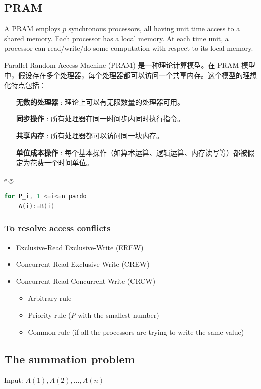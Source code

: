\documentclass{article}
\begin{document}
\subsection{PRAM}
A PRAM employs $p$ synchronous processors, all having unit time access to a shared memory. Each processor has a local memory. At each time unit, a processor can read/write/do some computation with respect to its local memory. 

Parallel Random Access Machine (PRAM) 是一种理论计算模型。在 PRAM 模型中，假设存在多个处理器，每个处理器都可以访问一个共享内存。这个模型的理想化特点包括：

\begin{enumerate}
    \item [\textbf{无数的处理器}]: 理论上可以有无限数量的处理器可用。
    \item [\textbf{同步操作}]: 所有处理器在同一时间步内同时执行指令。
    \item [\textbf{共享内存}]: 所有处理器都可以访问同一块内存。
    \item [\textbf{单位成本操作}]: 每个基本操作（如算术运算、逻辑运算、内存读写等）都被假定为花费一个时间单位。
\end{enumerate}


e.g.
\begin{lstlisting}[language={c}]
for P_i, 1 <=i<=n pardo
    A(i):=B(i)
\end{lstlisting}

\subsubsection{To resolve access conflicts}
\begin{itemize}
    \item Exclusive-Read Exclusive-Write (EREW)
    \item Concurrent-Read Exclusive-Write (CREW)
    \item Concurrent-Read Concurrent-Write (CRCW)
    \begin{itemize}
        \item Arbitrary rule
        \item Priority rule ($P$ with the smallest number)
        \item Common rule (if all the processors are trying to write the same value)
    \end{itemize}   
\end{itemize}

\subsection{The summation problem}
Input:  $A(1), A(2), \dots, A(n)$
\end{document}
